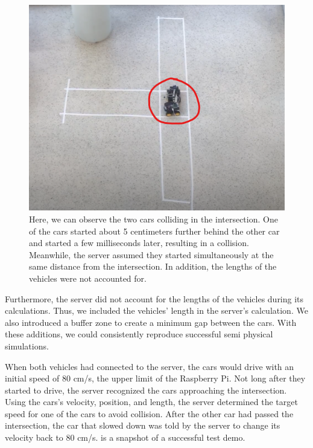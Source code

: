 \begin{figure}[h!]
	\centering
	\includegraphics[width=1\linewidth]{figures/demo_crash}
	\caption{Here, we can observe the two cars colliding in the intersection. One of the cars started about 5 centimeters further behind the other car and started a few milliseconds later, resulting in a collision. Meanwhile, the server assumed they started simultaneously at the same distance from the intersection. In addition, the lengths of the vehicles were not accounted for.}
	\label{fig:crashdemo}
\end{figure}

Furthermore, the server did not account for the lengths of the vehicles during its calculations. Thus, we included the vehicles' length in the server's calculation. We also introduced a buffer zone to create a minimum gap between the cars. With these additions, we could consistently reproduce successful semi physical simulations.

When both vehicles had connected to the server, the cars would drive with an initial speed of 80 cm/s, the upper limit of the Raspberry Pi. Not long after they started to drive, the server recognized the cars approaching the intersection. Using the cars's velocity, position, and length, the server determined the target speed for one of the cars to avoid collision. After the other car had passed the intersection, the car that slowed down was told by the server to change its velocity back to 80 cm/s.  is a snapshot of a successful test demo.

